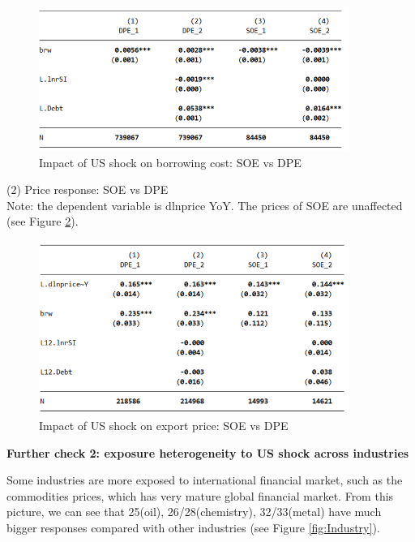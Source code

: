 \documentclass[12pt]{article}
\begin{document}
\begin{figure}
     \centering
         \includegraphics[width=0.9\textwidth]{latex/2023.10/Picture/IEoL_SOE_DPE.png}
         \caption{Impact of US shock on borrowing cost: SOE vs DPE}
         \label{fig:IEoL_SOE_DPE}
\end{figure}

(2) Price response: SOE vs DPE \\
Note: the dependent variable is dlnprice YoY. The prices of SOE are unaffected (see Figure \ref{fig:Price_brw_DPE_SOE}).

\begin{figure}
     \centering
         \includegraphics[width=0.9\textwidth]{latex/2023.10/Picture/Price_brw_DPE_SOE.png}
         \caption{Impact of US shock on export price: SOE vs DPE}
         \label{fig:Price_brw_DPE_SOE}
\end{figure}


\textbf{Further check 2: exposure heterogeneity to US shock across industries}

Some industries are more exposed to international financial market, such as the commodities prices, which has very mature global financial market. From this picture, we can see that 25(oil), 26/28(chemistry), 32/33(metal) have much bigger responses compared with other industries (see Figure \ref{fig:Industry}).
\end{document}
